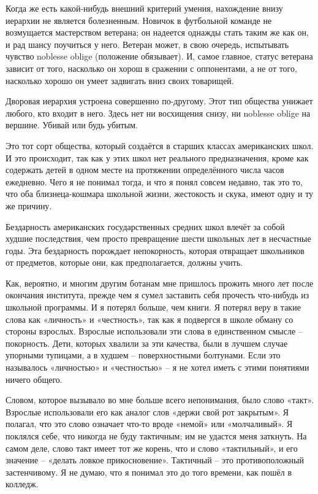 \documentclass[ebook,12pt,oneside,openany]{memoir}
\begin{document}
Когда же есть какой-нибудь внешний критерий умения, нахождение внизу
иерархии не является болезненным. Новичок в футбольной команде не
возмущается мастерством ветерана; он надеется однажды стать таким же
как он, и рад шансу поучиться у него. Ветеран может, в свою очередь,
испытывать чувство noblesse oblige (положение обязывает). И, самое
главное, статус ветерана зависит от того, насколько он хорош в
сражении с оппонентами, а не от того, насколько хорошо он умеет
задвигать вниз своих товарищей.

Дворовая иерархия устроена совершенно по-другому. Этот тип общества
унижает любого, кто входит в него. Здесь нет ни восхищения снизу, ни
noblesse oblige на вершине. Убивай или будь убитым.

Это тот сорт общества, который создаётся в старших классах
американских школ. И это происходит, так как у этих школ нет реального
предназначения, кроме как содержать детей в одном месте на протяжении
определённого числа часов ежедневно. Чего я не понимал тогда, и что я
понял совсем недавно, так это то, что оба близнеца-кошмара школьной
жизни, жестокость и скука, имеют одну и ту же причину.


Бездарность американских государственных средних школ влечёт за собой
худшие последствия, чем просто превращение шести школьных лет в
несчастные годы. Эта бездарность порождает непокорность, которая
отвращает школьников от предметов, которые они, как предполагается,
должны учить.

Как, вероятно, и многим другим ботанам мне пришлось прожить много лет
после окончания института, прежде чем я сумел заставить себя прочесть
что-нибудь из школьной программы. И я потерял больше, чем книги. Я
потерял веру в такие слова как «личность» и «честность», так как я
подвергся в школе обману со стороны взрослых. Взрослые использовали
эти слова в единственном смысле – покорность. Дети, которых хвалили за
эти качества, были в лучшем случае упорными тупицами, а в худшем –
поверхностными болтунами. Если это называлось «личностью» и
«честностью» – я не хотел иметь с этими понятиями ничего общего.

Словом, которое вызывало во мне больше всего непонимания, было слово
«такт». Взрослые использовали его как аналог слов «держи свой рот
закрытым». Я полагал, что это слово означает что-то вроде «немой» или
«молчаливый». Я поклялся себе, что никогда не буду тактичным; им не
удастся меня заткнуть. На самом деле, слово такт имеет тот же корень,
что и слово «тактильный», и его значение – «делать ловкое
прикосновение». Тактичный – это противоположный застенчивому. Я не
думаю, что я понимал это до того времени, как пошёл в колледж.
\end{document}
